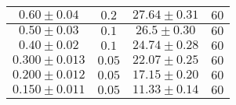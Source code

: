 \documentclass[../main.tex]{subfiles}
\begin{document}
\begin{tabular}{ ||c|c|c|c|| }
        $0.60\pm 0.04$      & $0.2$       & $27.64\pm 0.31$ & $60$     \\
        \hline
        $0.50\pm 0.03$      & $0.1$       & $26.5\pm 0.30$   & $60$     \\
        \hline
        $0.40\pm 0.02$      & $0.1$       & $24.74\pm 0.28$  & $60$     \\
        \hline
        $0.300\pm 0.013$      & $0.05$       & $22.07\pm 0.25$  & $60$     \\
        \hline
        $0.200\pm 0.012$      & $0.05$       & $17.15\pm 0.20$ & $60$     \\
        \hline
        $0.150\pm 0.011$     & $0.05$       & $11.33\pm 0.14$  & $60$     \\
        \hline

    \end{tabular}
\end{document}
